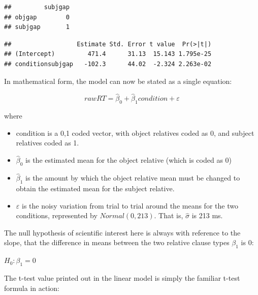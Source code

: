 \documentclass[
  12pt,
]{krantz}
\newenvironment{Shaded}{\begin{snugshade}}{\end{snugshade}}
\newcommand{\FunctionTok}[1]{\textcolor[rgb]{0.00,0.00,0.00}{#1}}
\newcommand{\NormalTok}[1]{#1}
\newcommand{\OtherTok}[1]{\textcolor[rgb]{0.56,0.35,0.01}{#1}}
\newcommand{\SpecialCharTok}[1]{\textcolor[rgb]{0.00,0.00,0.00}{#1}}
\providecommand{\tightlist}{%
  \setlength{\itemsep}{0pt}\setlength{\parskip}{0pt}}
\theoremstyle{definition}
\theoremstyle{definition}
\theoremstyle{definition}
\theoremstyle{definition}
\theoremstyle{remark}
\begin{document}
\begin{verbatim}
##         subjgap
## objgap        0
## subjgap       1
\end{verbatim}

\begin{Shaded}
\end{Shaded}

\begin{verbatim}
##                  Estimate Std. Error t value  Pr(>|t|)
## (Intercept)         471.4      31.13  15.143 1.795e-25
## conditionsubjgap   -102.3      44.02  -2.324 2.263e-02
\end{verbatim}

In mathematical form, the model can now be stated as a single equation:

\begin{equation}
rawRT = \hat\beta_0 + \hat\beta_1 condition + \varepsilon
\end{equation}

where

\begin{itemize}
\tightlist
\item
  condition is a 0,1 coded vector, with object relatives coded as 0, and subject relatives coded as 1.
\item
  \(\hat\beta_0\) is the estimated mean for the object relative (which is coded as 0)
\item
  \(\hat\beta_1\) is the amount by which the object relative mean must be
  changed to obtain the estimated mean for the subject relative.
\item
  \(\varepsilon\) is the noisy variation from trial to trial around the means for the two conditions, represented by \(Normal(0,213)\). That is, \(\hat\sigma\) is 213 ms.
\end{itemize}

The null hypothesis of scientific interest here is always with reference to the slope, that the difference in means between the two relative clause types \(\beta_1\) is 0:

\(H_0: \beta_1 = 0\)

The t-test value printed out in the linear model is simply the familiar t-test formula in action:
\end{document}
